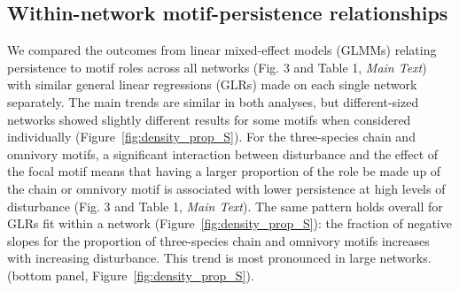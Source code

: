 \documentclass[12pt]{article}
\begin{document}
\begin{spacing}{2.0}
\clearpage

\section{Within-network motif-persistence relationships}

    We compared the outcomes from linear mixed-effect models (GLMMs) relating persistence to motif roles across all networks (Fig. 3 and Table 1, \emph{Main Text}) with similar general linear regressions (GLRs) made on each single network separately.
    The main trends are similar in both analyses, but different-sized networks showed slightly different results for some motifs when considered individually (Figure~\ref{fig:density_prop_S}).
    For the three-species chain and omnivory motifs, a significant interaction between disturbance and the effect of the focal motif means that having a larger proportion of the role be made up of the chain or omnivory motif is associated with lower persistence at high levels of disturbance (Fig. 3 and Table 1, \emph{Main Text}). 
    The same pattern holds overall for GLRs fit within a network  (Figure~\ref{fig:density_prop_S}): the fraction of negative slopes for the proportion of three-species chain and omnivory motifs increases with increasing disturbance. 
    This trend is most pronounced in large networks. (bottom panel, Figure~\ref{fig:density_prop_S}). 
    

\end{spacing}
\end{document}
